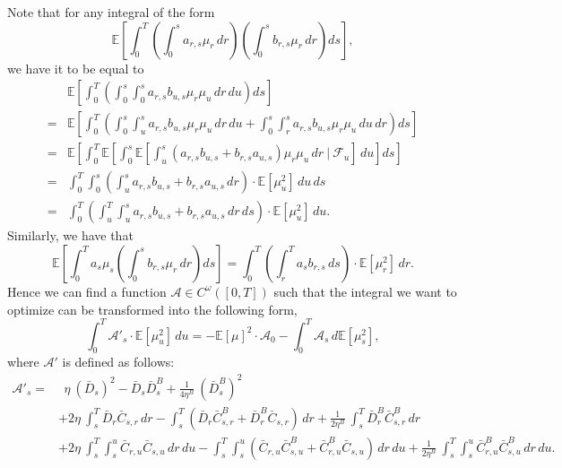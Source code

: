 \documentclass[10pt]{article}
\begin{document}
Note that for any integral of the form 
\[
\mathbb{E}\left[ \int_0^T \left( \int_0^s a_{r,s} \mu_r \, dr \right) \left( \int_0^s b_{r,s} \mu_r \, dr \right) ds \right],
\]
we have it to be equal to
\begin{align*}
      & \mathbb{E} \left[ \int_0^T \left( \int_0^s \int_0^s a_{r,s} b_{u,s} \mu_r \mu_u \, dr \, du \right) ds \right] \\
     =& \mathbb{E}\left[ \int_0^T \left( \int_0^s \int_u^s a_{r,s} b_{u,s} \mu_r \mu_u \, dr \, du +  \int_0^s \int_r^s a_{r,s} b_{u,s} \mu_r \mu_u \, du \, dr \right) ds \right] \\
     =& \mathbb{E} \left[ \int_0^T \mathbb{E}\left[ \int_0^s \mathbb{E}\left[ \int_u^s \left( a_{r,s} b_{u,s} + b_{r,s} a_{u,s} \right) \mu_r \mu_u \, dr \ \bigg| \ \mathcal{F}_u \right] \, du \right] ds \right] \\
     =& \int_0^T \int_0^s \left( \int_u^s a_{r,s} b_{u,s} + b_{r,s} a_{u,s} \, dr \right) \cdot \mathbb{E} [\mu_u^2] \, du \, ds \\ 
     =& \int_0^T \left( \int_u^T \int_u^s a_{r,s} b_{u,s} + b_{r,s} a_{u,s} \, dr \, ds \right) \cdot \mathbb{E} [\mu_u^2] \, du .
\end{align*}
Similarly, we have that 
\[
\mathbb{E}\left[ \int_0^T  a_s \mu_s \left( \int_0^s b_{r,s} \mu_r \, dr \right) ds \right] = \int_0^T \left( \int_r^T a_s b_{r,s} \, ds \right) \cdot \mathbb{E}[\mu_r^2] \, dr.
\]
Hence we can find a function $\mathcal{A} \in C^\omega([0,T])$ such that the integral we want to optimize can be transformed into the following form,
\[
\int_0^T \mathcal{A}'_s \cdot \mathbb{E}[\mu_u^2] \, du = - \mathbb{E}[\mu]^2 \cdot \mathcal{A}_0 - \int_0^T \mathcal{A}_s \, d \mathbb{E}[\mu_s^2],
\]
where $\mathcal{A}'$ is defined as follows:
\begin{equation}\label{A_derivative_definition}
    \begin{aligned}
        \mathcal{A}'_s = &~~ \eta~(\bar{D}_s)^2 - \bar{D}_s \bar{D}_s^B + \frac{1}{4\eta^B}~(\bar{D}_s^B)^2 \\
                      & + 2\eta~\int_s^T \bar{D}_r \bar{C}_{s,r} \, dr - \int_s^T (\bar{D}_r \bar{C}_{s,r}^B + \bar{D}_r^B \bar{C}_{s,r}) \, dr + \frac{1}{2\eta^B}~\int_s^T \bar{D}_r^B \bar{C}_{s,r}^B \, dr\\
                      & + 2\eta~ \int_s^T \int_s^u \bar{C}_{r,u} \bar{C}_{s,u} \, dr \, du - \int_s^T \int_s^u (\bar{C}_{r,u} \bar{C}^B_{s,u} + \bar{C}^B_{r,u} \bar{C}_{s,u}) \, dr \, du + \frac{1}{2\eta^B}~ \int_s^T \int_s^u \bar{C}^B_{r,u} \bar{C}^B_{s,u} \, dr \, du.
    \end{aligned}
\end{equation}
\end{document}

